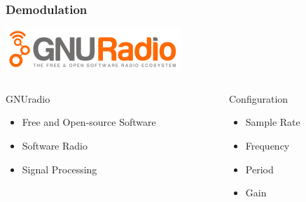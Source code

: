 
\begin{frame}
	\frametitle{Demodulation}
	\centering \includegraphics[scale=.5]{images/gnuradio_logo.png}

	\begin{columns}[c] %
		\begin{column}{.48\textwidth}
			\begin{block}{GNUradio}
				\begin{itemize}
					\item Free and Open-source Software
					\item Software Radio
					\item Signal Processing
				\end{itemize}
			\end{block}
		\end{column}%
		\hfill%
		\begin{column}{.48\textwidth}
			\begin{block}{Configuration}
				\begin{itemize}
					\item Sample Rate 
					\item Frequency
					\item Period
					\item Gain
				\end{itemize}
			\end{block}
		\end{column}%
	\end{columns}
\end{frame}

